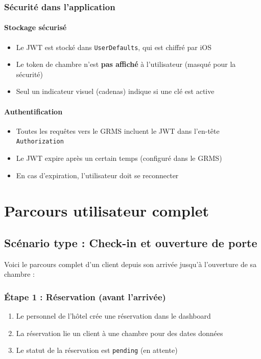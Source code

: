\documentclass[11pt,a4paper]{article}
\begin{document}
\subsubsection{Sécurité dans l'application}

\paragraph{Stockage sécurisé}
\begin{itemize}
    \item Le JWT est stocké dans \texttt{UserDefaults}, qui est chiffré par iOS
    \item Le token de chambre n'est \textbf{pas affiché} à l'utilisateur (masqué pour la sécurité)
    \item Seul un indicateur visuel (cadenas) indique si une clé est active
\end{itemize}

\paragraph{Authentification}
\begin{itemize}
    \item Toutes les requêtes vers le GRMS incluent le JWT dans l'en-tête \texttt{Authorization}
    \item Le JWT expire après un certain temps (configuré dans le GRMS)
    \item En cas d'expiration, l'utilisateur doit se reconnecter
\end{itemize}

\section{Parcours utilisateur complet}

\subsection{Scénario type : Check-in et ouverture de porte}

Voici le parcours complet d'un client depuis son arrivée jusqu'à l'ouverture de sa chambre :

\subsubsection{Étape 1 : Réservation (avant l'arrivée)}

\begin{enumerate}
    \item Le personnel de l'hôtel crée une réservation dans le dashboard
    \item La réservation lie un client à une chambre pour des dates données
    \item Le statut de la réservation est \texttt{pending} (en attente)
\end{enumerate}
\end{document}
